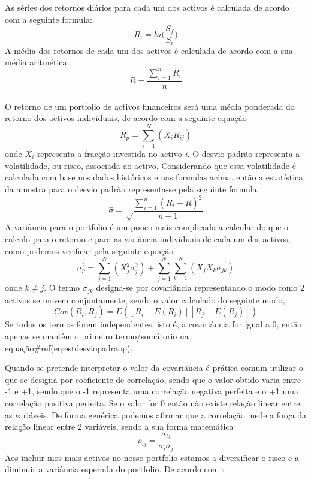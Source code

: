 \documentclass[
  12pt,
  a4paper,
  openany]{book}
\begin{document}
As séries dos retornos diários para cada um dos activos é calculada de acordo com a seguinte formula:
\begin{equation} 
  R_i = ln\Big(\frac{S_f}{S_i}\Big)
  \label{eq:logRet}
\end{equation}
A média dos retornos de cada um dos activos é calculada de acordo com a sua média aritmética:
\begin{equation} 
  \overline{R} = \frac{\displaystyle\sum_{i=1}^n R_i}{n}
  \label{eq:meanRet}
\end{equation}\\
O retorno de um portfolio de activos financeiros será uma média ponderada do retorno dos activos individuais, de acordo com a seguinte equação
\begin{equation} 
    R_{p} = \sum_{i=1}^{N}(X_{i}R_{ij})
  \label{eq:retp}
\end{equation}
onde \(X_{i}\) representa a fracção investida no activo \emph{i}.
O desvio padrão representa a volatilidade, ou risco, associada ao activo. Considerando que essa volatilidade é calculada com base nos dados históricos e nas formulas acima, então a estatística da amostra para o desvio padrão representa-se pela seguinte formula:
\begin{equation} 
  \hat{\sigma} = \sqrt\frac{\displaystyle\sum_{i=1}^n (R_i-\overline{R})^2}{n-1}
  \label{eq:estdesviopadrao}
\end{equation}
A variância para o portfolio é um pouco mais complicada a calcular do que o calculo para o retorno e para as variância individuais de cada um dos activos, como podemos verificar pela seguinte equação
\begin{equation} 
  \sigma_{p}^{2} = \sum_{j=1}^{N}(X_{j}^{2}\sigma_{j}^{2})+\sum_{j=1}^{N}\sum_{k=1}^{N}(X_{j}X_{k}\sigma_{jk})
  \label{eq:estdesviopadraop}
\end{equation}
onde \(k\neq j\). O termo \(\sigma_{jk}\) designa-se por covariância representando o modo como 2 activos se movem conjuntamente, sendo o valor calculado do seguinte modo,
\begin{equation} 
  Cov(R_{i},R_{j}) = E([R_{i}-E(R_{i})][R_{j}-E(R_{j})])
  \label{eq:covariancia}
\end{equation}
Se todos os termos forem independentes, isto é, a covariância for igual a 0, então apenas se mantêm o primeiro termo/somátorio na equação\#ref(eq:estdesviopadraop).

Quando se pretende interpretar o valor da covariância é prática comum utilizar o que se designa por coeficiente de correlação, sendo que o valor obtido varia entre -1 e +1, sendo que o -1 representa uma correlação negativa perfeita e o +1 uma correlação positiva perfeita. Se o valor for 0 então não existe relação linear entre as variáveis. De forma genérica podemos afirmar que a correlação mede a força da relação linear entre 2 variáveis, sendo a sua forma matemática \[\rho_{ij}=\frac{\sigma_{ij}}{\sigma_{i}\sigma_{j}}\]
Aos incluir-mos mais activos no nosso portfolio estamos a diversificar o risco e a diminuir a variância esperada do portfolio. De acordo com \citet{Goetzmann2014}:
\end{document}
